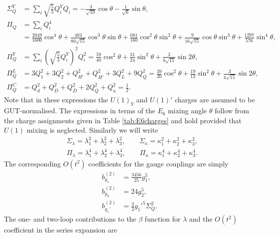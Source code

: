 \documentclass[preprint,amsmath,amssymb,aps,superscriptaddress,prd,showpacs,floatfix,nofootinbib]{revtex4-1}
\begin{document}
\begin{align*}
\Sigma_{Q}^Y&=\sum_i \sqrt{\frac{5}{3}}Q_i^YQ_i=-\frac{3}{\sqrt{10}}\cos\theta-\frac{1}{\sqrt{6}}\sin\theta,\\
\Pi_{Q}&=\sum_i Q_i^4\\
&=\frac{2049}{1600}\cos^4\theta+\frac{483}{80\sqrt{15}}\cos^3\theta\sin\theta+\frac{681}{160}\cos^2\theta\sin^2\theta+\frac{9}{16\sqrt{15}}\cos\theta\sin^3\theta+\frac{1297}{576}\sin^4\theta,\\
\Pi_{Q}^Y&=\sum_i \left ( \sqrt{\frac{5}{3}}Q_i^Y\right )^2Q_i^2=\frac{59}{40}\cos^2\theta+\frac{31}{24}\sin^2\theta+\frac{3}{8\sqrt{15}}\sin 2\theta,\\
\Pi_{Q}^L&=3Q_1^2+3Q_2^2+Q_{H'}^2+Q_{\overline{H'}}^2+3Q_L^2+9Q_Q^2=\frac{39}{20}\cos^2\theta+\frac{19}{12}\sin^2\theta+\frac{3}{4\sqrt{15}}\sin 2\theta,\\
\Pi_{Q}^C&=Q_d^2+Q_D^2+Q_{\overline{D}}^2+2Q_Q^2+Q_u^2=\frac{1}{2}.
\end{align*}
Note that in these expressions the $U(1)_Y$ and $U(1)'$ charges are assumed to be GUT-normalised. The expressions in terms of the $E_6$ mixing angle $\theta$ follow from the charge assignments given in Table \ref{tab:E6charges} and hold provided that $U(1)$ mixing is neglected. Similarly we will write
\begin{align*}
&\Sigma_\lambda=\lambda_1^2+\lambda_2^2+\lambda_3^2, \qquad \Sigma_\kappa=\kappa_1^2+\kappa_2^2+\kappa_3^2,\\
&\Pi_\lambda=\lambda_1^4+\lambda_2^4+\lambda_3^4,\qquad \Pi_\kappa=\kappa_1^4+\kappa_2^4+\kappa_3^4.
\end{align*}
The corresponding $O(t^2)$ coefficients for the gauge couplings are simply
\begin{subequations}\label{eq:USSMGaugeOt2Coeffs}
\begin{align}
b_{g_1}^{(2)}&=\frac{3456}{25}g_1^5,\label{eq:USSMg1Ot2Coeff}\\
b_{g_2}^{(2)}&=24g_2^5,\label{eq:USSMg2Ot2Coeff}\\
b_{g_1'}^{(2)}&=\frac{3}{2}g_1'^5\Sigma_{Q}^2.\label{eq:USSMg1pOt2Coeff}
\end{align}
\end{subequations}
The one- and two-loop contributions to the $\beta$ function for $\lambda$
and the $O(t^2)$ coefficient in the series expansion are
\end{document}
